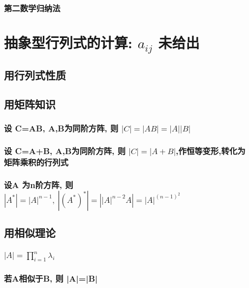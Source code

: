 \documentclass[UTF8]{ctexart}
\begin{document}
		\subsubsection{第二数学归纳法}
	
	
	\section{抽象型行列式的计算: $a_{ij}$ 未给出	}
	
		\subsection{用行列式性质}
		
		\subsection{用矩阵知识}
		
			\subsubsection{设 C=AB, A,B为同阶方阵, 则 $|C|=|AB|=|A||B|$}
			
			\subsubsection{设 C=A+B, A,B为同阶方阵, 则 $|C|=|A+B|$,作恒等变形,转化为矩阵乘积的行列式 }
			
			\subsubsection{设A 为n阶方阵, 则 $|A^*|=|A|^{n-1},\ |(A^*)^*|=\left| \left| A \right|^{n-2}A \right|=\left| A \right|^{\left( n-1 \right) ^2}	$}
		
		\subsection{用相似理论}
		
			\subsubsection{$\left| A \right|=\prod_{i=1}^n{\lambda _i}$}
			
			\subsubsection{若A相似于B, 则 |A|=|B|}
	
	
	
\end{document}
